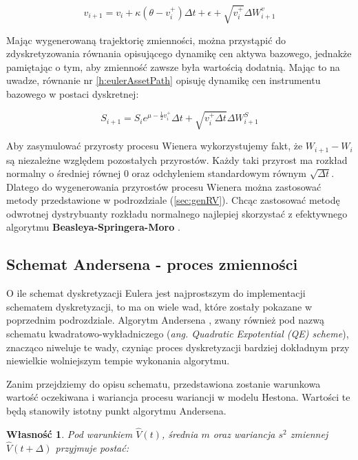\documentclass{pracamgr}
\newtheorem{prop}{Własność}
\begin{document}
{\begin{equation}\label{h:eulerNonZero}
v_{i+1}  = v_i + \kappa (\theta - v_i^+) \Delta t + \epsilon +  \sqrt{v_i^+} \Delta W^{v}_{i+1}
\end{equation}

Mając wygenerowaną trajektorię zmienności, można przystąpić do zdyskretyzowania równania opisującego 
dynamikę cen aktywa bazowego, jednakże pamiętając o tym, aby zmienność zawsze była wartością dodatnią. 
Mając to na uwadze, równanie nr \ref{h:eulerAssetPath} opisuję dynamikę cen instrumentu bazowego w postaci dyskretnej:

\begin{equation}\label{h:eulerAssetPath}
S_{i+1} = S_i e^{\mu - \frac{1}{2} v_i^+} \Delta t + \sqrt{v_i^+ \Delta t}  \Delta W_{i+1}^S
\end{equation}
  
Aby zasymulować przyrosty procesu Wienera wykorzystujemy fakt, że $W_{i+1}  - W_{i}$ są niezależne względem pozostałych przyrostów. 
Każdy taki przyrost ma rozkład normalny o średniej równej $0$  oraz odchyleniem standardowym równym $\sqrt{\Delta t}$. 
Dlatego do wygenerowania przyrostów procesu Wienera można zastosować metody przedstawione w podrozdziale (\ref{sec:genRV}). Chcąc zastosować metodę odwrotnej dystrybuanty rozkładu normalnego najlepiej skorzystać z efektywnego algorytmu \textbf{Beasleya-Springera-Moro} \cite{Glasserman}.


\subsection{Schemat Andersena - proces zmienności}
\label{sec:algorytm_andersena}
O ile schemat dyskretyzacji Eulera jest najprostszym do implementacji schematem dyskretyzacji, to ma on wiele wad, które zostały pokazane w poprzednim podrozdziale.
Algorytm Andersena \cite{Andersen}, zwany również pod nazwą schematu kwadratowo-wykładniczego (\textit{ang. Quadratic Expotential (QE) scheme}),
znacząco niweluje te wady, czyniąc proces dyskretyzacji bardziej dokładnym przy niewielkie wolniejszym tempie wykonania algorytmu. 

Zanim przejdziemy do opisu schematu, przedstawiona zostanie warunkowa wartość oczekiwana i wariancja procesu wariancji w modelu Hestona. Wartości te będą stanowiły istotny punkt algorytmu Andersena.
\begin{prop}
Pod warunkiem $\hat{V}(t)$, średnia $m$ oraz wariancja $s^2$ zmiennej $\hat{V}(t + \Delta)$ przyjmuje postać:


\end{prop}}
\end{document}
